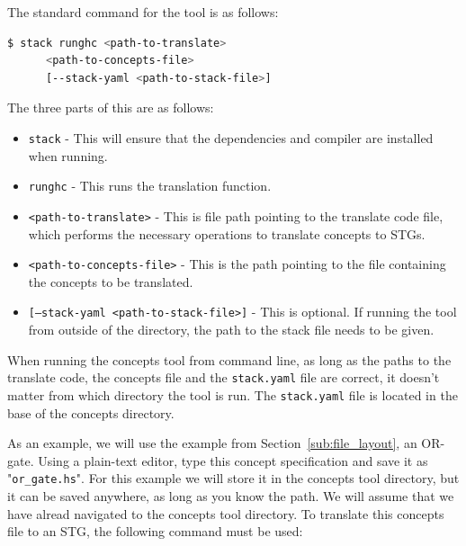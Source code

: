 \documentclass[british,conference,compsoc]{IEEEtran}
\begin{document}
\vspace{-2mm}

The standard command for the tool is as follows:

\vspace{-2mm}

\begin{lstlisting}[language=bash]
  $ stack runghc <path-to-translate> 
      <path-to-concepts-file> 
      [--stack-yaml <path-to-stack-file>]
\end{lstlisting}

\vspace{-1mm}

The three parts of this are as follows:
\begin{itemize}
\vspace{-2mm}
  \item \texttt{stack} - This will ensure that the dependencies and compiler 
  	are installed when running.
  \item \texttt{runghc} - This runs the translation function.
  \item \texttt{<path-to-translate>} - This is file path pointing to the 
  	translate code file, which performs the necessary operations to translate 
	concepts to STGs.
  \item \texttt{<path-to-concepts-file>} - This is the path pointing to the file
  	containing the concepts to be translated.
  \item \texttt{[--stack-yaml <path-to-stack-file>]} - This is optional. If 
  	running the tool from outside of the directory, the path to the stack file 
	 needs to be given.
\end{itemize}
\vspace{-2mm}

When running the concepts tool from command line, as long as the paths to the 
translate code, the concepts file and the \texttt{stack.yaml} file are correct,
it doesn't matter from which directory the tool is run.  The \texttt{stack.yaml}
file is located in the base of the concepts directory.

As an example, we will use the example from Section~\ref{sub:file_layout}, an 
OR-gate. Using a plain-text editor, type this concept specification and save it
as "\texttt{or\_gate.hs}". For this example we will store it in the concepts
tool directory, but it can be saved anywhere, as long as you know the path.
We will assume that we have alread navigated to the concepts tool
directory. To translate this concepts file to an STG, the following command
must be used:
\end{document}
